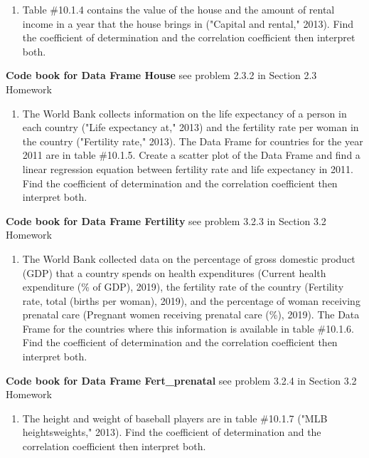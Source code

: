 \documentclass[]{book}
\providecommand{\tightlist}{%
  \setlength{\itemsep}{0pt}\setlength{\parskip}{0pt}}
\begin{document}
\begin{enumerate}
\def\labelenumi{\arabic{enumi}.}
\setcounter{enumi}{1}
\tightlist
\item
  Table \#10.1.4 contains the value of the house and the amount of rental income in a year that the house brings in ("Capital and rental," 2013). Find the coefficient of determination and the correlation coefficient then interpret both.
\end{enumerate}

\textbf{Code book for Data Frame House} see problem 2.3.2 in Section 2.3 Homework

\begin{enumerate}
\def\labelenumi{\arabic{enumi}.}
\setcounter{enumi}{2}
\tightlist
\item
  The World Bank collects information on the life expectancy of a person in each country ("Life expectancy at," 2013) and the fertility rate per woman in the country ("Fertility rate," 2013). The Data Frame for countries for the year 2011 are in table \#10.1.5. Create a scatter plot of the Data Frame and find a linear regression equation between fertility rate and life expectancy in 2011. Find the coefficient of determination and the correlation coefficient then interpret both.
\end{enumerate}

\textbf{Code book for Data Frame Fertility} see problem 3.2.3 in Section 3.2 Homework

\begin{enumerate}
\def\labelenumi{\arabic{enumi}.}
\setcounter{enumi}{3}
\tightlist
\item
  The World Bank collected data on the percentage of gross domestic product (GDP) that a country spends on health expenditures (Current health expenditure (\% of GDP), 2019), the fertility rate of the country (Fertility rate, total (births per woman), 2019), and the percentage of woman receiving prenatal care (Pregnant women receiving prenatal care (\%), 2019). The Data Frame for the countries where this information is available in table \#10.1.6. Find the coefficient of determination and the correlation coefficient then interpret both.
\end{enumerate}

\textbf{Code book for Data Frame Fert\_prenatal} see problem 3.2.4 in Section 3.2 Homework

\begin{enumerate}
\def\labelenumi{\arabic{enumi}.}
\setcounter{enumi}{4}
\tightlist
\item
  The height and weight of baseball players are in table \#10.1.7 ("MLB heightsweights," 2013). Find the coefficient of determination and the correlation coefficient then interpret both.
\end{enumerate}
\end{document}

